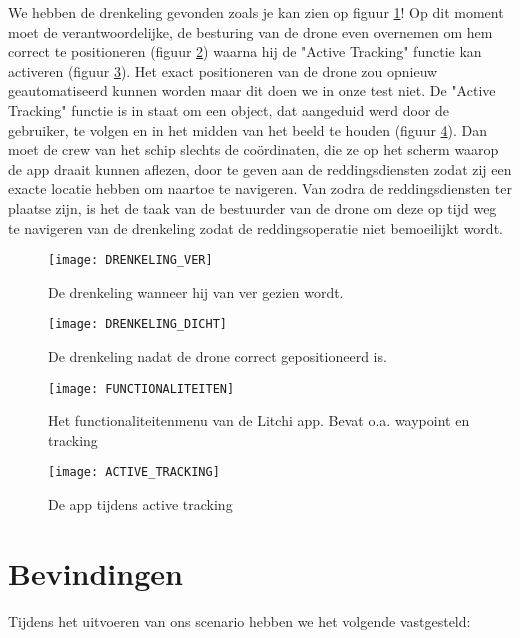 We hebben de drenkeling gevonden zoals je kan zien op figuur \ref{far}! Op dit moment moet de verantwoordelijke, de besturing van de drone even overnemen om hem correct te positioneren (figuur \ref{close}) waarna hij de "Active Tracking" functie kan activeren (figuur \ref{funcswitch}). Het exact positioneren van de drone zou opnieuw geautomatiseerd kunnen worden maar dit doen we in onze test niet. De "Active Tracking" functie is in staat om een object, dat aangeduid werd door de gebruiker, te volgen en in het midden van het beeld te houden (figuur \ref{activetrack}). Dan moet de crew van het schip slechts de coördinaten, die ze op het scherm waarop de app draait kunnen aflezen, door te geven aan de reddingsdiensten zodat zij een exacte locatie hebben om naartoe te navigeren. Van zodra de reddingsdiensten ter plaatse zijn, is het de taak van de bestuurder van de drone om deze op tijd weg te navigeren van de drenkeling zodat de reddingsoperatie niet bemoeilijkt wordt.

\newpage

\begin{figure}[h]
	\centering
	\texttt{[image: DRENKELING\_VER]}
	\caption{De drenkeling wanneer hij van ver gezien wordt.}
	\label{far}
\end{figure}
\begin{figure}[h]
	\centering
	\texttt{[image: DRENKELING\_DICHT]}
	\caption{De drenkeling nadat de drone correct gepositioneerd is.}
	\label{close}
\end{figure}

\newpage

\begin{figure}[h]
	\centering
	\texttt{[image: FUNCTIONALITEITEN]}
	\caption{Het functionaliteitenmenu van de Litchi app. Bevat o.a. waypoint en tracking}
	\label{funcswitch}
\end{figure}
\begin{figure}[h]
	\centering
	\texttt{[image: ACTIVE\_TRACKING]}
	\caption{De app tijdens active tracking}
	\label{activetrack}
\end{figure}

\newpage

\section{Bevindingen}

Tijdens het uitvoeren van ons scenario hebben we het volgende vastgesteld:

